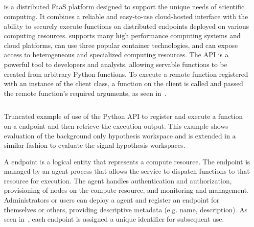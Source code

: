 \subsection{\funcX{}}\label{subsec:funcX}
\funcX{} is a distributed FaaS platform designed to support the unique needs of scientific computing.
It combines a reliable and easy-to-use cloud-hosted interface with the ability to securely execute functions on distributed endpoints deployed on various computing resources.
\funcX{} supports many high performance computing systems and cloud platforms, can use three popular container technologies, and can expose access to heterogeneous and specialized computing resources.
The \funcX{} API is a powerful tool to developers and analysts, allowing servable functions to be created from arbitrary Python functions.
To execute a remote function registered with an instance of the \funcX{} client class, a function on the \funcX{} client is called and passed the remote function's required arguments, as seen in~.

\begin{listing}
 \inputminted{python}{src/code/funcX_registration_example.py}
 \caption{Truncated example of use of the \funcX{} Python API to register and execute a \pyhf{} function on a \funcX{} endpoint and then retrieve the execution output.
 This example shows evaluation of the background only hypothesis workspace and is extended in a similar fashion to evaluate the signal hypothesis workspaces.}
 \label{lst:funcX_registration_example}
\end{listing}

A \funcX{} endpoint is a logical entity that represents a compute resource.
The endpoint is managed by an agent process that allows the \funcX{} service to dispatch functions to that resource for execution.
The agent handles authentication and authorization, provisioning of nodes on the compute resource, and monitoring and management.
Administrators or users can deploy a \funcX{} agent and register an endpoint for themselves or others, providing descriptive  metadata (e.g. name, description).
As seen in~, each endpoint is assigned a unique identifier for subsequent use.\\

